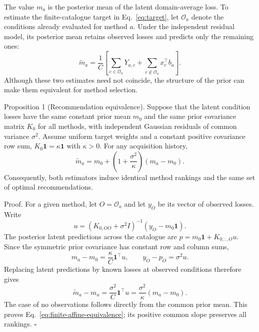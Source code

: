 \documentclass[10pt,a4paper]{article}
\newif\ifrevisionmarked
\newcommand{\revadd}[1]{\ifrevisionmarked\hl{#1}\else#1\fi}
\newcommand{\revaddmath}[1]{\ifrevisionmarked\colorbox{yellow}{$#1$}\else#1\fi}
\begin{document}
\revadd{The value} $\revaddmath{m_a}$ \revadd{is the posterior mean of the latent domain-average loss. To estimate the finite-catalogue target in Eq.}~\eqref{eq:target}, \revadd{let} $\revaddmath{\mathcal O_a}$ \revadd{denote the conditions already evaluated for method} $\revaddmath{a}$. \revadd{Under the independent residual model, its posterior mean retains observed losses and predicts only the remaining ones:}
\begin{equation}
\revaddmath{\displaystyle \widetilde m_a=
\frac{1}{C}\left[
\sum_{c\in\mathcal O_a}Y_{a,c}+
\sum_{c\notin\mathcal O_a}x_c^\top b_a
\right].}
\label{eq:finite-posterior-mean}
\end{equation}
\revadd{Although these two estimates need not coincide, the structure of the prior can make them equivalent for method selection.}

\noindent\revadd{Proposition 1 (Recommendation equivalence).}
\revadd{Suppose that the latent condition losses have the same constant prior mean} $\revaddmath{m_0}$ \revadd{and the same prior covariance matrix} $\revaddmath{K_0}$ \revadd{for all methods, with independent Gaussian residuals of common variance} $\revaddmath{\sigma^2}$. \revadd{Assume uniform target weights and a constant positive covariance row sum,}
$\revaddmath{K_0\mathbf 1=\kappa\mathbf 1}$ \revadd{with} $\revaddmath{\kappa>0}$. \revadd{For any acquisition history,}
\begin{equation}
\revaddmath{\displaystyle \widetilde m_a=m_0+
\left(1+\frac{\sigma^2}{\kappa}\right)(m_a-m_0).}
\label{eq:finite-affine-equivalence}
\end{equation}
\revadd{Consequently, both estimators induce identical method rankings and the same set of optimal recommendations.}

\noindent\revadd{Proof.}
\revadd{For a given method, let} $\revaddmath{O=\mathcal O_a}$ \revadd{and let} $\revaddmath{y_O}$ \revadd{be its vector of observed losses. Write}
\[
\revaddmath{\displaystyle u=(K_{0,OO}+\sigma^2 I)^{-1}
(y_O-m_0\mathbf 1).}
\]
\revadd{The posterior latent predictions across the catalogue are}
$\revaddmath{p=m_0\mathbf 1+K_{0,:,O}u}$.
\revadd{Since the symmetric prior covariance has constant row and column sums,}
\[
\revaddmath{\displaystyle m_a-m_0=\frac{\kappa}{C}\mathbf 1^\top u,
\qquad y_O-p_O=\sigma^2 u.}
\]
\revadd{Replacing latent predictions by known losses at observed conditions therefore gives}
\[
\revaddmath{\displaystyle \widetilde m_a-m_a
=\frac{\sigma^2}{C}\mathbf 1^\top u
=\frac{\sigma^2}{\kappa}(m_a-m_0).}
\]
\revadd{The case of no observations follows directly from the common prior mean. This proves Eq.}~\eqref{eq:finite-affine-equivalence}; \revadd{its positive common slope preserves all rankings.} \hfill$\square$
\end{document}
